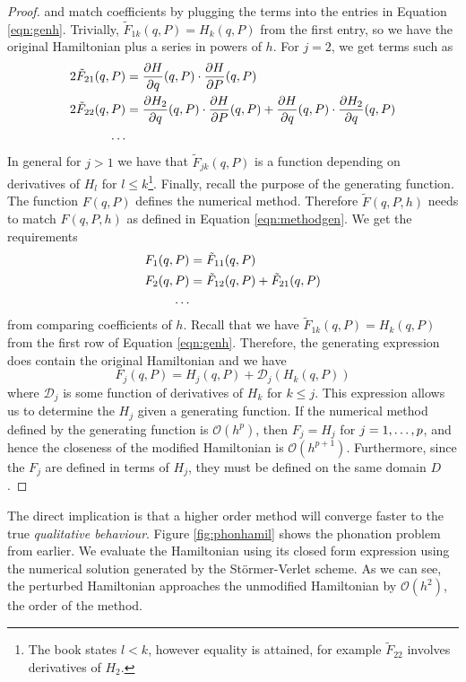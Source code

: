 \begin{proof}
	and match coefficients by plugging the terms into the entries in Equation \ref{eqn:genh}.
	Trivially, $\tilde{F}_{1k}(q,P) = H_k(q,P)$ from the first entry, so we have the original Hamiltonian plus a series in powers of $h$.
	For $j=2$, we get terms such as
	\begin{align*}
		2 \tilde{F}_{21}(q,P) &= \frac{\partial H}{\partial q}(q,P) \cdot \frac{\partial H}{\partial P}(q,P) \\
		2 \tilde{F}_{22}(q,P) &= \frac{\partial H_2}{\partial q}(q,P) \cdot \frac{\partial H}{\partial P}(q,P) + \frac{\partial H}{\partial q}(q,P) \cdot \frac{\partial H_2}{\partial q}(q,P) \\
		\mathellipsis
	\end{align*}
	In general for $j > 1$ we have that $\tilde{F}_{jk}(q,P)$ is a function depending on derivatives of $H_l$ for $l \leq k$\footnote{
		The book states $l < k$, however equality is attained, for example $\tilde{F}_{22}$ involves derivatives of $H_2$.
	}.
	Finally, recall the purpose of the generating function.
	The function $F(q,P)$ defines the numerical method.
	Therefore $\tilde{F}(q,P,h)$ needs to match $F(q,P,h)$ as defined in Equation \ref{eqn:methodgen}.
	We get the requirements
	\begin{align*}
		F_1(q,P) &= \tilde{F}_{11}(q,P) \\
		F_2(q,P) &= \tilde{F}_{12}(q,P) + \tilde{F}_{21}(q,P) \\
		\mathellipsis
	\end{align*}
	from comparing coefficients of $h$.
	Recall that we have $\tilde{F}_{1k}(q,P) = H_k(q,P)$ from the first row of Equation \ref{eqn:genh}.
	Therefore, the generating expression does contain the original Hamiltonian and we have
	\begin{equation*}
		F_j(q,P) = H_j(q,P) + \mathcal{D}_j(H_k(q,P))
	\end{equation*}
	where $\mathcal{D}_j$ is some function of derivatives of $H_k$ for $k \leq j$.
	This expression allows us to determine the $H_j$ given a generating function. %
	If the numerical method defined by the generating function is $\mathcal{O}(h^p)$,
	then $F_j = H_j$ for $j = 1, \mathellipsis, p$, and hence the closeness of the modified Hamiltonian is $\mathcal{O}(h^{p+1})$.
	Furthermore, since the $F_j$ are defined in terms of $H_j$, they must be defined on the same domain $D$.
\end{proof}

The direct implication is that a higher order method will converge faster to the true \textit{qualitative behaviour}.
Figure \ref{fig:phonhamil} shows the phonation problem from earlier.
We evaluate the Hamiltonian using its closed form expression using the numerical solution generated by the St\"ormer-Verlet scheme.
As we can see, the perturbed Hamiltonian approaches the unmodified Hamiltonian by $\mathcal{O}(h^2)$, the order of the method.

